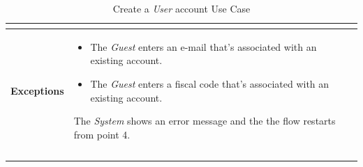 \documentclass {article}
\begin{document}
\begin{longtable}{| p{3 cm} | p{10.5 cm} |}
\begin{itemize}
			\end{itemize}
			\\
			\hline
			{\bf Exceptions} & 	
			\begin{itemize}
				\item The {\it Guest} enters an e-mail that's associated with an existing account.
				\item The {\it Guest} enters a fiscal code that's associated with an existing account. 
			\end{itemize}
			The {\it System} shows an error message and the the flow restarts from point 4.
			\\ \\
			\hline
			\caption{Create a {\it User} account Use Case}
			\end{longtable}

\end{document}
